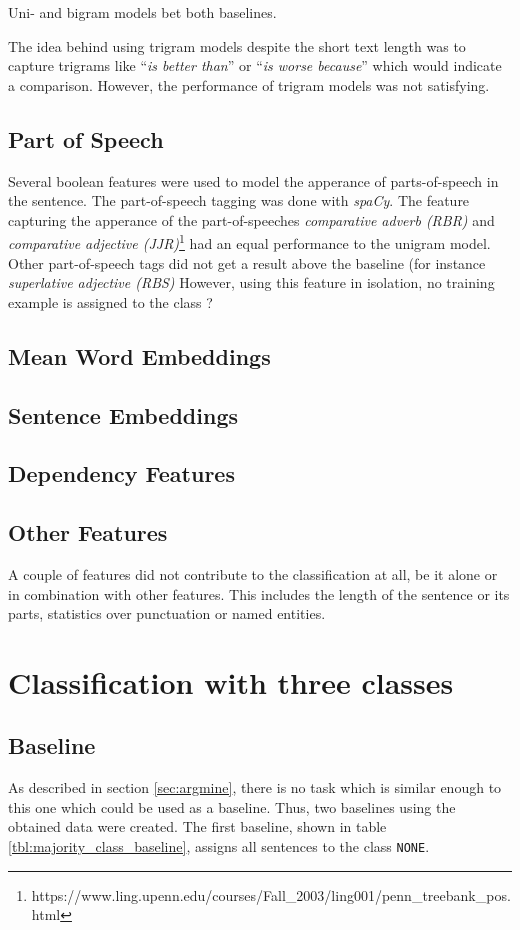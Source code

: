 Uni- and bigram models bet both baselines.

The idea behind using trigram models despite the short text length was to capture trigrams like \enquote{\emph{is better than}} or \enquote{\emph{is worse because}} which would indicate a comparison. However, the performance of trigram models was not satisfying.
\label{sec:ngrams}

\subsection{Part of Speech}
Several boolean features were used to model the apperance of parts-of-speech in the sentence. The part-of-speech tagging was done with \emph{spaCy}. The feature capturing the apperance of the part-of-speeches \emph{comparative adverb (RBR)} and \emph{comparative adjective (JJR)}\footnote{https://www.ling.upenn.edu/courses/Fall\_2003/ling001/penn\_treebank\_pos.html} had an equal performance to the unigram model. Other part-of-speech tags did not get a result above the baseline (for instance \emph{superlative adjective (RBS)} However, using this feature in isolation, no training example is assigned to the class ?

\subsection{Mean Word Embeddings}

\subsection{Sentence Embeddings}
\subsection{Dependency Features}
\subsection{Other Features}
A couple of features did not contribute to the classification at all, be it alone or in combination with other features. This includes the length of the sentence or its parts, statistics over punctuation or named entities.

\section{Classification with three classes}
\subsection{Baseline}
\label{sec:baseline}
As described in section \ref{sec:argmine}, there is no task which is similar enough to this one which could be used as a baseline. Thus, two baselines using the obtained data were created. The first baseline, shown in table \ref{tbl:majority_class_baseline}, assigns all sentences to the class \texttt{NONE}.




